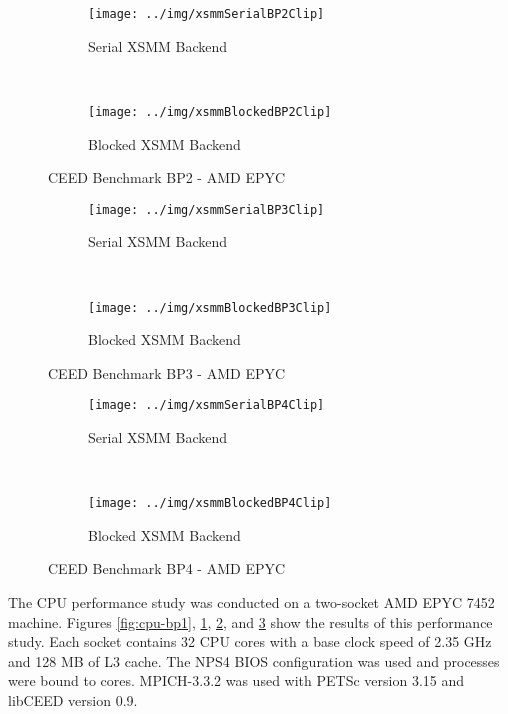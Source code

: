 \begin{figure}[ht!]
\begin{subfigure}{.99\textwidth}
\texttt{[image: ../img/xsmmSerialBP2Clip]}
\caption{Serial XSMM Backend}
\end{subfigure}\\
\begin{subfigure}{.99\textwidth}
\texttt{[image: ../img/xsmmBlockedBP2Clip]}
\caption{Blocked XSMM Backend}
\end{subfigure}
\caption{CEED Benchmark BP2 - AMD EPYC}
\label{fig:cpu-bp2}
\end{figure}

\begin{figure}[ht!]
\begin{subfigure}{.99\textwidth}
\texttt{[image: ../img/xsmmSerialBP3Clip]}
\caption{Serial XSMM Backend}
\end{subfigure}\\
\begin{subfigure}{.99\textwidth}
\texttt{[image: ../img/xsmmBlockedBP3Clip]}
\caption{Blocked XSMM Backend}
\end{subfigure}
\caption{CEED Benchmark BP3 - AMD EPYC}
\label{fig:cpu-bp3}
\end{figure}

\begin{figure}[ht!]
\begin{subfigure}{.95\textwidth}
\texttt{[image: ../img/xsmmSerialBP4Clip]}
\caption{Serial XSMM Backend}
\end{subfigure}\\
\begin{subfigure}{.95\textwidth}
\texttt{[image: ../img/xsmmBlockedBP4Clip]}
\caption{Blocked XSMM Backend}
\end{subfigure}
\caption{CEED Benchmark BP4 - AMD EPYC}
\label{fig:cpu-bp4}
\end{figure}

The CPU performance study was conducted on a two-socket AMD EPYC 7452 machine.
Figures \ref{fig:cpu-bp1}, \ref{fig:cpu-bp2}, \ref{fig:cpu-bp3}, and \ref{fig:cpu-bp4} show the results of this performance study.
Each socket contains 32 CPU cores with a base clock speed of 2.35 GHz and 128 MB of L3 cache.
The NPS4 BIOS configuration was used and processes were bound to cores.
MPICH-3.3.2 was used with PETSc \cite{petsc-user-ref} version 3.15 and libCEED \cite{libceed} version 0.9.

